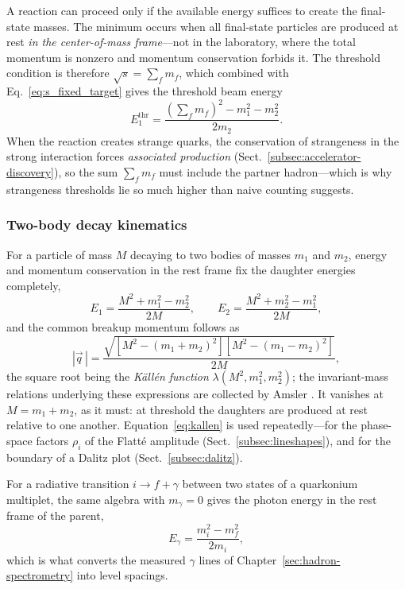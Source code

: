 A reaction can proceed only if the available energy suffices to create the final-state
masses. The minimum occurs when all final-state particles are produced at rest
\emph{in the center-of-mass frame}---not in the laboratory, where the total momentum is
nonzero and momentum conservation forbids it. The threshold condition is therefore
$\sqrt{s} = \sum_f m_f$, which combined with Eq.~\eqref{eq:s_fixed_target} gives the
threshold beam energy
\begin{equation}
    E_1^{\mathrm{thr}}
    = \frac{\left(\sum_f m_f\right)^{2} - m_1^2 - m_2^2}{2 m_2}.
    \label{eq:threshold}
\end{equation}
When the reaction creates strange quarks, the conservation of strangeness in the strong
interaction forces \emph{associated production}
(Sect.~\ref{subsec:accelerator-discovery}), so the sum $\sum_f m_f$ must include the
partner hadron---which is why strangeness thresholds lie so much higher than naive
counting suggests.

\subsubsection{Two-body decay kinematics}
\label{subsubsec:twobody}

For a particle of mass $M$ decaying to two bodies of masses $m_1$ and $m_2$, energy and
momentum conservation in the rest frame fix the daughter energies completely,
\begin{equation}
    E_1 = \frac{M^2 + m_1^2 - m_2^2}{2M},
    \qquad
    E_2 = \frac{M^2 + m_2^2 - m_1^2}{2M},
    \label{eq:twobody_energy}
\end{equation}
and the common breakup momentum follows as
\begin{equation}
    |\vec q\,| = \frac{\sqrt{\left[M^2 - (m_1+m_2)^2\right]\left[M^2 - (m_1-m_2)^2\right]}}{2M},
    \label{eq:kallen}
\end{equation}
the square root being the \emph{K\"all\'en function} $\lambda(M^2, m_1^2, m_2^2)$;
the invariant-mass relations underlying these expressions are collected by Amsler
\cite[App.~B]{Amsler2018}. It
vanishes at $M = m_1 + m_2$, as it must: at threshold the daughters are produced at rest
relative to one another. Equation~\eqref{eq:kallen} is used repeatedly---for the
phase-space factors $\rho_i$ of the Flatt\'e amplitude
(Sect.~\ref{subsec:lineshapes}), and for the boundary of a Dalitz plot
(Sect.~\ref{subsec:dalitz}).

For a radiative transition $i \to f + \gamma$ between two states of a quarkonium
multiplet, the same algebra with $m_\gamma = 0$ gives the photon energy in the rest
frame of the parent,
\begin{equation}
    E_\gamma = \frac{m_i^2 - m_f^2}{2 m_i},
    \label{eq:radiative_photon}
\end{equation}
which is what converts the measured $\gamma$ lines of Chapter~\ref{sec:hadron-spectrometry}
into level spacings.

